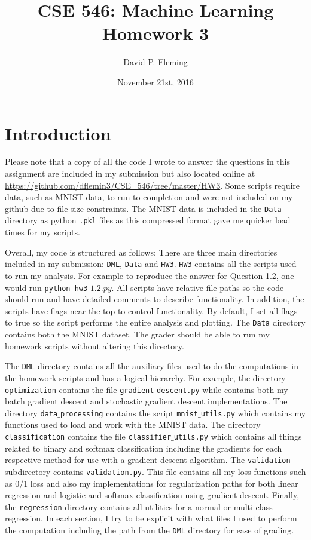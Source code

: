 \documentclass[12pt]{amsart}
\title{CSE 546: Machine Learning Homework 3}
\author{David P. Fleming}
\date{November 21st, 2016}
\begin{document}
\maketitle
\tableofcontents

\section*{Introduction}

Please note that a copy of all the code I wrote to answer the questions in this assignment are included in my submission but also located online at \url{https://github.com/dflemin3/CSE_546/tree/master/HW3}.  Some scripts require data, such as MNIST data, to run to completion and were not included on my github due to file size constraints.  The MNIST data is included in the {\tt Data} directory as python {\tt .pkl} files as this compressed format gave me quicker load times for my scripts.

Overall, my code is structured as follows:  There are three main directories included in my submission: {\tt DML}, {\tt Data} and {\tt HW3}. {\tt HW3} contains all the scripts used to run my analysis.  For example to reproduce the answer for Question 1.2, one would run {\tt python hw3$\_1.2.py$}.  All scripts have relative file paths so the code should run and have detailed comments to describe functionality.  In addition, the scripts have flags near the top to control functionality.  By default, I set all flags to true so the script performs the entire analysis and plotting.  The {\tt Data} directory contains both the MNIST dataset. The grader should be able to run my homework scripts without altering this directory.  

The {\tt DML} directory contains all the auxiliary files used to do the computations in the homework scripts and has a logical hierarchy.  For example, the directory {\tt optimization} contains the file {\tt gradient$\_$descent.py} while contains both my batch gradient descent and stochastic gradient descent implementations.  The directory {\tt data$\_$processing} contains the script {\tt mnist$\_$utils.py} which contains my functions used to load and work with the MNIST data.  The directory {\tt classification} contains the file {\tt classifier$\_$utils.py} which contains all things related to binary and softmax classification including the gradients for each respective method for use with a gradient descent algorithm.  The {\tt validation} subdirectory contains {\tt validation.py}.  This file contains all my loss functions such as 0/1 loss and also my implementations for regularization paths for both linear regression and logistic and softmax classification using gradient descent.  Finally, the {\tt regression} directory contains all utilities for a normal or multi-class regression.  In each section, I try to be explicit with what files I used to perform the computation including the path from the {\tt DML} directory for ease of grading.
\end{document}
